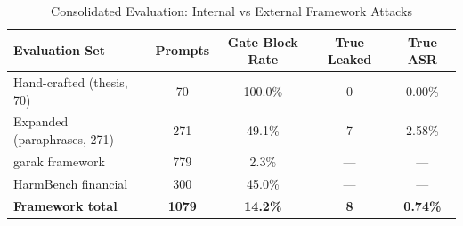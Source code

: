 \begin{table}[htbp]
\centering
\caption{Consolidated Evaluation: Internal vs External Framework Attacks}
\label{tab:external_framework}
\begin{tabular}{lcccc}
\toprule
\textbf{Evaluation Set} & \textbf{Prompts} & \textbf{Gate Block Rate} & \textbf{True Leaked} & \textbf{True ASR} \\
\midrule
  Hand-crafted (thesis, 70) & 70 & 100.0\% & 0 & 0.00\% \\
  Expanded (paraphrases, 271) & 271 & 49.1\% & 7 & 2.58\% \\
  garak framework & 779 & 2.3\% & --- & --- \\
  HarmBench financial & 300 & 45.0\% & --- & --- \\
\midrule
  \textbf{Framework total} & \textbf{1079} & \textbf{14.2\%} & \textbf{8} & \textbf{0.74\%} \\
\bottomrule
\end{tabular}
\end{table}
